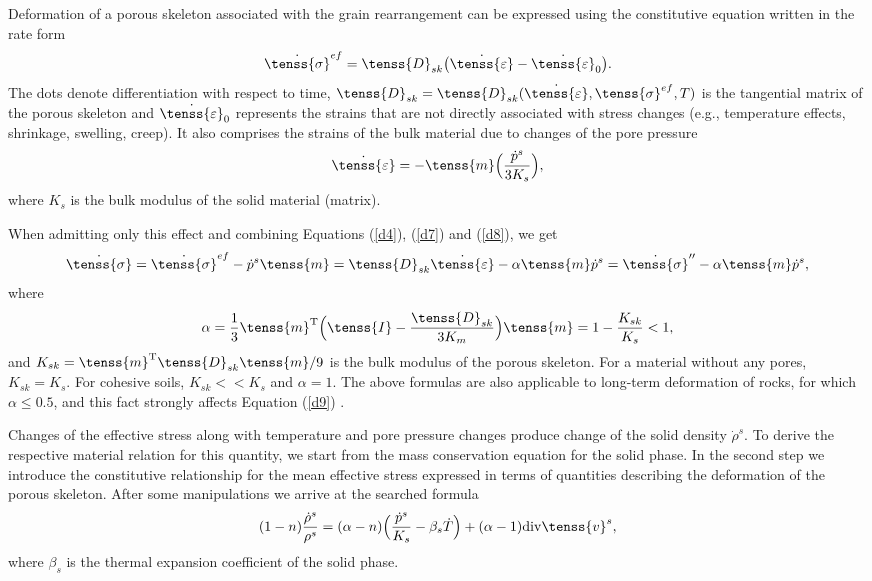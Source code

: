 Deformation of a porous skeleton associated with the grain rearrangement can be expressed using 
the constitutive equation written in the rate form
\begin{equation}\label{d7}
\dot{\tenss{\sigma}}^{ef} = \tenss{D}_{sk} \big(\dot{\tenss{\varepsilon}} - \dot{\tenss{\varepsilon}}_0 \big).
\end{equation}
The dots denote differentiation with respect to time, $\tenss{D}_{sk} = \tenss{D}_{sk}(\dot{\tenss{\varepsilon}}, 
{\tenss{\sigma}}^{ef}, T) $ is the tangential matrix of the porous skeleton and $\dot{\tenss{\varepsilon}}_0$ 
represents the strains that are not directly associated with stress changes (e.g., temperature effects, shrinkage, 
swelling, creep). It also comprises the strains of the bulk material due to changes of the pore pressure
\begin{equation}\label{d8}
\dot{\tenss{\varepsilon}} =  -\tenss{m} \Big( \frac{\dot{p}^s}{3K_s} \Big),
\end{equation}
where $K_s$ is the bulk modulus of the solid material (matrix).

When admitting only this effect and combining Equations (\ref{d4}), (\ref{d7}) and (\ref{d8}), we get
\begin{equation}\label{d9}
\dot{\tenss{\sigma}} = \dot{\tenss{\sigma}}^{ef} - \dot{p}^s \tenss{m} = \tenss{D}_{sk} \dot{\tenss{\varepsilon}}
- \alpha \tenss{m} \dot{p}^s = \dot{\tenss{\sigma}}'' - \alpha \tenss{m} \dot{p}^s,
\end{equation}
where
\begin{equation}\label{d10}
\alpha = \frac{1}{3} \tenss{m}^{\rm T} \Big( \tenss{I} - \frac{\tenss{D}_{sk}}{3K_m} \Big) \tenss{m} = 1 - 
\frac{K_{sk}}{K_s} < 1,
\end{equation}
and $K_{sk} = \tenss{m}^{\rm T} \tenss{D}_{sk} \tenss{m}/9$ is the bulk modulus of the porous skeleton. 
For a material without any pores, $K_{sk} = K_s$. For cohesive soils, $K_{sk} << K_s$ and $\alpha = 1$. 
The above formulas are also applicable to long-term deformation of rocks, for which  $\alpha \leq 0.5$, 
and this fact strongly affects Equation (\ref{d9}) \cite{zienkiewicz83}.

Changes of the effective stress along with temperature and pore pressure changes produce change of the solid density 
$\dot{\rho}^s$. To derive the respective material relation for this quantity, we start from the mass conservation equation 
for the solid phase. In the second step we introduce the constitutive relationship for the mean effective stress expressed 
in terms of quantities describing the deformation of the porous skeleton. After some manipulations we arrive at the 
searched formula
\begin{equation}\label{d15}
(1 - n)\frac {\dot{\rho}^s}{\rho^s} = (\alpha - n)\Big(\frac {\dot{p}^s}{K_s} - \beta_s \dot{T}\Big) + 
(\alpha - 1){\rm div} \tenss{v}^s,
\end{equation}
where $\beta_s$ is the thermal expansion coefficient of the solid phase.

